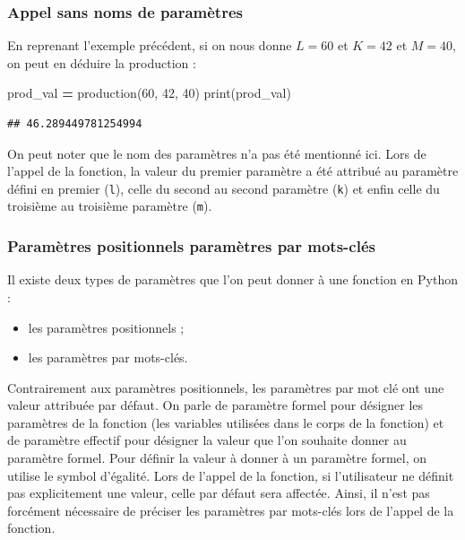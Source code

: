 \documentclass[12pt,]{book}
\newenvironment{Shaded}{\begin{snugshade}}{\end{snugshade}}
\newcommand{\DecValTok}[1]{\textcolor[rgb]{0.00,0.00,0.81}{#1}}
\newcommand{\OperatorTok}[1]{\textcolor[rgb]{0.81,0.36,0.00}{\textbf{#1}}}
\newcommand{\BuiltInTok}[1]{#1}
\newcommand{\NormalTok}[1]{#1}
\providecommand{\tightlist}{%
  \setlength{\itemsep}{0pt}\setlength{\parskip}{0pt}}
\numberwithin{equation}{section}
\numberwithin{countremarque}{section}
\begin{document}
\subsubsection{Appel sans noms de
paramètres}\label{appel-sans-noms-de-parametres}

En reprenant l'exemple précédent, si on nous donne \(L = 60\) et
\(K = 42\) et \(M = 40\), on peut en déduire la production :

\begin{Shaded}
\begin{Highlighting}[]
\NormalTok{prod_val }\OperatorTok{=}\NormalTok{ production(}\DecValTok{60}\NormalTok{, }\DecValTok{42}\NormalTok{, }\DecValTok{40}\NormalTok{)}
\BuiltInTok{print}\NormalTok{(prod_val)}
\end{Highlighting}
\end{Shaded}

\begin{lstlisting}
## 46.289449781254994
\end{lstlisting}

On peut noter que le nom des paramètres n'a pas été mentionné ici. Lors
de l'appel de la fonction, la valeur du premier paramètre a été attribué
au paramètre défini en premier (\texttt{l}), celle du second au second
paramètre (\texttt{k}) et enfin celle du troisième au troisième
paramètre (\texttt{m}).

\subsubsection{Paramètres positionnels paramètres par
mots-clés}\label{parametres-positionnels-parametres-par-mots-cles}

Il existe deux types de paramètres que l'on peut donner à une fonction
en Python :

\begin{itemize}
\tightlist
\item
  les paramètres positionnels ;
\item
  les paramètres par mots-clés.
\end{itemize}

Contrairement aux paramètres positionnels, les paramètres par mot clé
ont une valeur attribuée par défaut. On parle de paramètre formel pour
désigner les paramètres de la fonction (les variables utilisées dans le
corps de la fonction) et de paramètre effectif pour désigner la valeur
que l'on souhaite donner au paramètre formel. Pour définir la valeur à
donner à un paramètre formel, on utilise le symbol d'égalité. Lors de
l'appel de la fonction, si l'utilisateur ne définit pas explicitement
une valeur, celle par défaut sera affectée. Ainsi, il n'est pas
forcément nécessaire de préciser les paramètres par mots-clés lors de
l'appel de la fonction.
\end{document}
